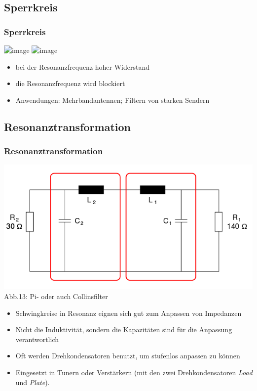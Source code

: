 \subsection*{Sperrkreis}
\begin{frame}
  \frametitle{Sperrkreis}
  \begin{center}
    \includegraphics<1>[width=\textwidth,height=.5\textheight,keepaspectratio]{e07/Sperrkreis.png}
    \includegraphics<2>[width=\textwidth,height=.5\textheight,keepaspectratio]{e07/ParallelschwSig.png}
  \end{center}
  \pause
  \begin{itemize}
    \item bei der Resonanzfrequenz hoher Widerstand
    \item die Resonanzfrequenz wird blockiert
    \item Anwendungen: Mehrbandantennen; Filtern von starken Sendern
  \end{itemize}
\end{frame}

\subsection*{Resonanz\-trans\-formation}
\begin{frame}
  \frametitle{Resonanztransformation}
  \begin{center}
    \includegraphics[scale=0.2]{a04/Pi-Filter.png}\\
    Abb.13: Pi- oder auch Collinsfilter \cite{wpde}
  \end{center}
  \begin{itemize}
    \item Schwingkreise in Resonanz eignen sich gut zum Anpassen von Impedanzen
    \item Nicht die Induktivität, sondern die Kapazitäten sind für die Anpassung verantwortlich
    \item Oft werden Drehkondensatoren benutzt, um stufenlos anpassen zu können
    \item Eingesetzt in Tunern oder Verstärkern (mit den zwei Drehkondensatoren \emph{Load} und \emph{Plate}).
  \end{itemize}
\end{frame}

